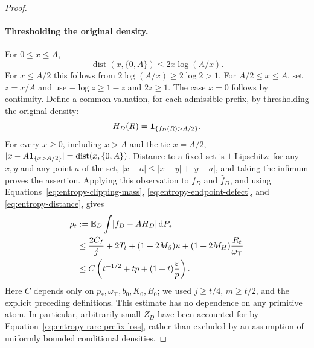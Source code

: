 \begin{proof}
\paragraph{Thresholding the original density.}
For $0\le x\le A$,
\begin{equation}
 \label{eq:entropy-distance}
 \operatorname{dist}(x,\{0,A\})\le2x\log(A/x).
\end{equation}
For $x\le A/2$ this follows from $2\log(A/x)\ge2\log2>1$.
For $A/2\le x\le A$, set $z=x/A$ and use
$-\log z\ge1-z$ and $2z\ge1$.  The case $x=0$ follows by continuity.
Define a common valuation, for each admissible prefix, by thresholding
the original density:
\[
 H_D(R)=\mathbf 1_{\{f_D(R)>A/2\}}.
\]
For every $x\ge0$, including $x>A$ and the tie $x=A/2$,
$\lvert x-A\mathbf 1_{\{x>A/2\}}\rvert=\operatorname{dist}(x,\{0,A\})$.
Distance to a fixed set is $1$-Lipschitz: for any $x,y$ and any point
$a$ of the set, $|x-a|\le|x-y|+|y-a|$, and taking the infimum proves
the assertion.  Applying this observation to $f_D$ and $\widehat f_D$,
and using Equations~\ref{eq:entropy-clipping-mass},
\ref{eq:entropy-endpoint-defect}, and \ref{eq:entropy-distance}, gives
\begin{align}
 \rho_t
 &:=\mathbb E_D\int\lvert f_D-AH_D\rvert\,\mathrm d P_*
 \notag\\
 &\le\frac{2C_I}{j}+2T_t+(1+2M_\beta)u
                  +(1+2M_H)\frac{R_t}{\omega_\top}
 \notag\\
 &\le C\left(t^{-1/2}+tp+(1+t)\frac{\varepsilon}{p}\right).
 \label{eq:entropy-l1-rate}
\end{align}
Here $C$ depends only on $p_*,\omega_\top,b_0,K_0,B_0$;
we used $j\ge t/4$, $m\ge t/2$, and the explicit preceding definitions.
This estimate has no dependence on any primitive atom.  In particular,
arbitrarily small $Z_D$ have been accounted for by
Equation~\ref{eq:entropy-rare-prefix-loss}, rather than excluded by an
assumption of uniformly bounded conditional densities.


\end{proof}
